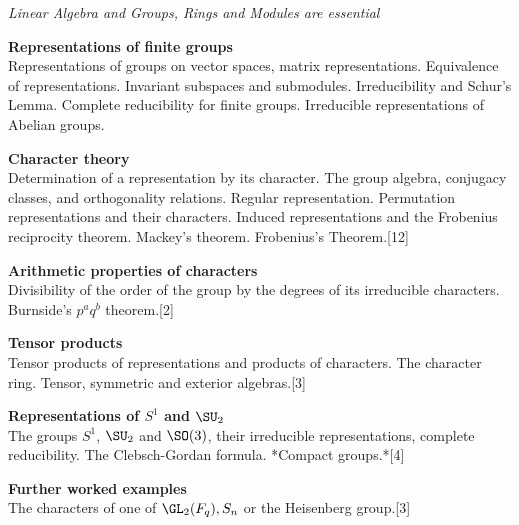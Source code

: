 \documentclass[a4paper]{article}
\begin{document}
\maketitle
{\small
\noindent\emph{Linear Algebra and Groups, Rings and Modules are essential}
\vspace{10pt}

\noindent\textbf{Representations of finite groups}\\
Representations of groups on vector spaces, matrix representations. Equivalence of representations. Invariant subspaces and submodules. Irreducibility and Schur's Lemma. Complete reducibility for finite groups. Irreducible representations of Abelian groups.

\vspace{10pt}
\noindent\textbf{Character theory}\\
Determination of a representation by its character. The group algebra, conjugacy classes, and orthogonality relations. Regular representation. Permutation representations and their characters. Induced representations and the Frobenius reciprocity theorem. Mackey's theorem. Frobenius's Theorem.\hspace*{\fill}[12]

\vspace{10pt}
\noindent\textbf{Arithmetic properties of characters}\\
Divisibility of the order of the group by the degrees of its irreducible characters. Burnside's $p^a q^b$ theorem.\hspace*{\fill}[2]

\vspace{10pt}
\noindent\textbf{Tensor products}\\
Tensor products of representations and products of characters. The character ring. Tensor, symmetric and exterior algebras.\hspace*{\fill}[3]

\vspace{10pt}
\noindent\textbf{Representations of $S^1$ and $\SU_2$}\\
The groups $S^1$, $\SU_2$ and $\SO(3)$, their irreducible representations, complete reducibility. The Clebsch-Gordan formula. *Compact groups.*\hspace*{\fill}[4]

\vspace{10pt}
\noindent\textbf{Further worked examples}\\
The characters of one of $\GL_2(F_q), S_n$ or the Heisenberg group.\hspace*{\fill}[3]%
}
\end{document}
